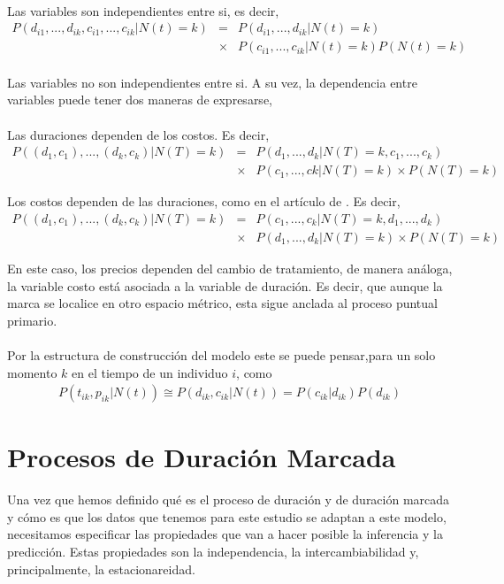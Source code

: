 \\
Las variables son independientes entre si, es decir,
\begin{eqnarray*}
P(d_{i1},...,d_{ik},c_{i1},...,c_{ik}|N(t)=k)&=&P(d_{i1},...,d_{ik}|N(t)=k)\\
&\times& P(c_{i1},...,c_{ik}|N(t)=k)P(N(t)=k)
\end{eqnarray*}
\\
Las variables no son independientes entre si. A su vez, la dependencia entre variables puede tener dos maneras de expresarse,\\
\\
Las duraciones dependen de los costos. Es decir,
\begin{eqnarray*}
	P((d_1,c_1),...,(d_k,c_k)|N(T)=k)&=& P(d_1,...,d_k|N(T)=k,c_1,...,c_k)\\
								 &\times& P(c_1,...,ck|N(T)=k)\times P(N(T)=k)
\end{eqnarray*}

Los costos dependen de las duraciones, como en el art\'iculo de \cite{engle1998autoregressive}. Es decir,
	\begin{eqnarray*}
     P((d_1,c_1),...,(d_k,c_k)|N(T)=k)&=& P(c_1,...,c_k|N(T)=k,d_1,...,d_k)\\
								 &\times& P(d_1,...,d_k|N(T)=k)\times P(N(T)=k)
    \end{eqnarray*}	

En este caso, los precios dependen del cambio de tratamiento, de manera an\'aloga, la variable costo est\'a asociada a la variable de duraci\'on. Es decir, que aunque la marca se localice en otro espacio m\'etrico, esta sigue anclada al proceso puntual primario.\\
\\
Por la estructura de construcci\'on del modelo este se puede pensar,para un solo momento $k$ en el tiempo de un individuo $i$, como
\begin{align}
P(t_{ik},p_{ik}|N(t))\cong P(d_{ik},c_{ik}|N(t)) = P(c_{ik}|d_{ik})P(d_{ik})
\end{align}

\section{Procesos de Duraci\'on Marcada}
Una vez que hemos definido qu\'e es el proceso de duraci\'on y de duraci\'on marcada y c\'omo es que los datos que tenemos para este estudio se adaptan a este modelo, necesitamos especificar las propiedades que van a hacer posible la inferencia y la predicci\'on. Estas propiedades son la independencia, la intercambiabilidad y, principalmente, la estacionareidad.
